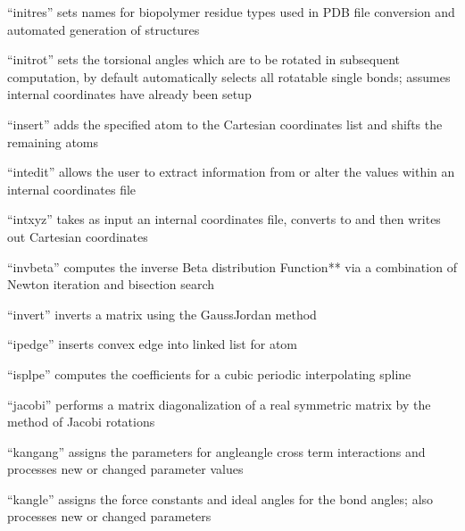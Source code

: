 \documentclass[letterpaper,11pt,english]{sphinxmanual}
\begin{document}

“initres” sets names for biopolymer residue types used in PDB file conversion and automated generation of structures


“initrot” sets the torsional angles which are to be rotated in subsequent computation, by default automatically selects all rotatable single bonds; assumes internal coordinates have already been setup


“insert” adds the specified atom to the Cartesian coordinates list and shifts the remaining atoms


“intedit” allows the user to extract information from or alter the values within an internal coordinates file


“intxyz” takes as input an internal coordinates file, converts to and then writes out Cartesian coordinates


“invbeta” computes the inverse Beta distribution Function** via a combination of Newton iteration and bisection search


“invert” inverts a matrix using the Gauss\sphinxhyphen{}Jordan method


“ipedge” inserts convex edge into linked list for atom


“isplpe” computes the coefficients for a cubic periodic interpolating spline


“jacobi” performs a matrix diagonalization of a real symmetric matrix by the method of Jacobi rotations


“kangang” assigns the parameters for angle\sphinxhyphen{}angle cross term interactions and processes new or changed parameter values


“kangle” assigns the force constants and ideal angles for the bond angles; also processes new or changed parameters
\end{document}
